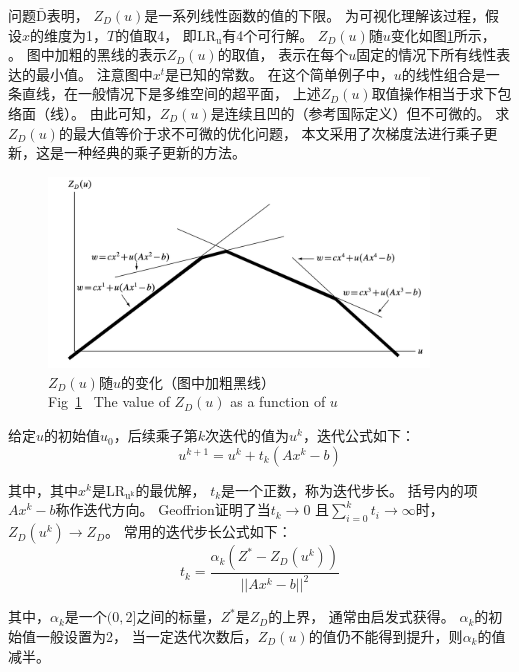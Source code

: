 问题$\mathrm{\bar{D}}$表明，
$Z_D(u)$是一系列线性函数的值的下限。
为可视化理解该过程，假设$x$的维度为1，$T$的值取4，
即$\mathrm{LR_u}$有4个可行解。
$Z_D(u)$随$u$变化如图\ref{fig:lag}所示，
。
图中加粗的黑线的表示$Z_D(u)$的取值，
表示在每个$u$固定的情况下所有线性表达的最小值。
注意图中$x^t$是已知的常数。
在这个简单例子中，$u$的线性组合是一条直线，在一般情况下是多维空间的超平面，
上述$Z_D(u)$取值操作相当于求下包络面（线）。
由此可知，$Z_D(u)$是连续且凹的（参考国际定义）但不可微的。
求$Z_D(u)$的最大值等价于求不可微的优化问题，
本文采用了次梯度法进行乘子更新，这是一种经典的乘子更新的方法。
\begin{figure}[ht] %
\setlength{\belowcaptionskip}{-0.5cm} 
  \centering
  \includegraphics[width=0.9\textwidth]{figures/lag.pdf}
  \caption{$Z_D(u)$随$u$的变化（图中加粗黑线）\cite{Fisher2004} \\Fig~\ref{fig:lag}~ The value of $Z_D(u)$ as a function of $u$ \cite{Fisher2004}}
  \label{fig:lag}
\end{figure}

给定$u$的初始值$u_0$，后续乘子第$k$次迭代的值为$u^k$，迭代公式如下：
\begin{equation}
u^{k+1} = u^{k} + t_k(Ax^k-b) \label{eq:updlagmul}
\end{equation}

其中，其中$x^k$是$\mathrm{LR_{u^k}}$的最优解，
$t_k$是一个正数，称为迭代步长。
括号内的项$Ax^k-b$称作迭代方向。
Geoffrion\cite{Geoffrion1974}证明了当$t_k \rightarrow 0$
且$\sum_{i=0}^kt_i  \rightarrow \infty$时，$Z_D(u^k)  \rightarrow Z_D$。
常用的迭代步长公式如下：
\begin{equation}
   t_k = \frac{\alpha_k(Z^*-Z_D(u^k))} {||Ax^k-b||^2} 
\end{equation}

其中，$\alpha_k$是一个$(0,2]$之间的标量，$Z^*$是$Z_D$的上界，
通常由启发式获得。
$\alpha_k$的初始值一般设置为2，
当一定迭代次数后，$Z_D(u)$的值仍不能得到提升，则$\alpha_k$的值减半。


